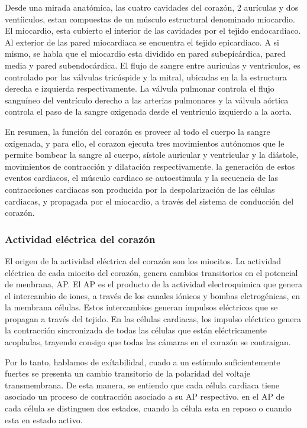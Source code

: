 Desde una mirada anatómica, las cuatro cavidades del corazón, 2 aurículas y
dos ventíiculos, estan compuestas de un músculo estructural denominado
miocardio. El miocardio, esta cubierto el interior de las cavidades por el
tejido endocardiaco. Al exterior de las pared miocardiaca se encuentra el tejido
epicardiaco. A si mismo, se habla que el miocardio esta dividido en
pared subepicárdica, pared media y pared subendocárdica. El flujo de sangre
entre auriculas y ventriculos, es controlado por las válvulas tricúspide  y la
mitral, ubicadas en la la estructura derecha e izquierda respectivamente.
La válvula pulmonar controla el flujo sanguíneo del ventrículo derecho a las
arterias pulmonares y la válvula aórtica controla el paso de la sangre oxigenada
desde el ventrículo izquierdo a la aorta.

En resumen, la función del corazón es proveer al todo el cuerpo la sangre
oxigenada, y para ello, el corazon ejecuta tres movimientos autónomos que le
permite bombear la sangre al cuerpo, sístole auricular y ventricular y  la
diástole, movimientos de contracción y dilatación respectivamente. la generación
de estos eventos cardiacos, el músculo cardiaco se autoestimula y la secuencia
de las contracciones cardiacas son producida  por la despolarización de las
células cardiacas, y  propagada por el miocardio, a través del sistema de
conducción del corazón.



\subsubsection{Actividad eléctrica del corazón }

El origen de la actividad eléctrica del corazón son los miocitos. La actividad
eléctrica de cada miocito del corazón, genera cambios transitorios en el
potencial de menbrana, \ac{AP}. El \ac{AP} es el producto de la actividad
electroquimica que genera el intercambio de iones, a través de los canales
iónicos  y bombas elctrogénicas, en la membrana células. Estos intercambios
generan impulsos eléctricos que se propagan a través del tejido. En las células
cardiacas, los impulso eléctrico genera la contracción sincronizada de todas
las células  que están eléctricamente acopladas, trayendo consigo que todas las
cámaras en el corazón se contraigan.

Por lo tanto, hablamos de exítabilidad, cuado a un estímulo suficientemente
fuertes se presenta un cambio transitorio de la polaridad del voltaje
transmembrana. De esta manera, se entiendo que cada célula cardiaca tiene
asociado un proceso de contracción asociado a su \ac{AP} respectivo. en el
\ac{AP} de cada célula se distinguen dos estados, cuando la célula esta en
reposo o cuando esta en estado activo.


